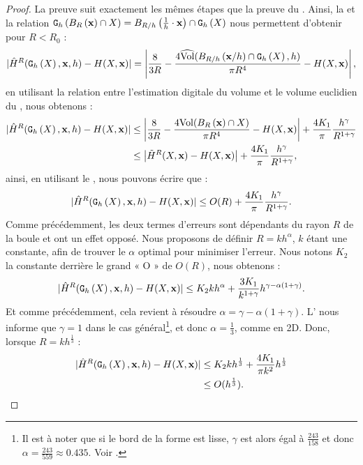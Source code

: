 \begin{proof}
  La preuve suit exactement les mêmes étapes que la preuve du
  . Ainsi, la
   et la relation
  $\DigF{\Ball{R}{\vx} \cap \Shape}{h}=\Ball{R/h}{\frac{1}{h} \cdot \vx} \cap \DSh$ nous
  permettent d'obtenir pour $R < R_0$ :
  \begin{equation}
    | \MeanCurvH{R}(\DSh,\vx,h) - \MeanCurv(\Shape,\vx) |
    = \left|\frac{8}{3R}-\frac{4\VolC(\Ball{R/h}{\vx / h} \cap \DSh, h)}{\pi R^4} - \MeanCurv(\Shape,\vx) \right|,
  \end{equation}
  en utilisant la relation entre l'estimation digitale du volume et le volume
  euclidien du , nous obtenons :
  \begin{align}\label{eq-meancurvhat-error-bound-prelim}
    | \MeanCurvH{R}(\DSh,\vx,h) - \MeanCurv(\Shape,\vx) |
    &\le \left|\frac{8}{3R}-\frac{4\Vol(\Ball{R}{\vx} \cap \Shape)}{\pi R^4} - \MeanCurv(\Shape,\vx) \right| + \frac{4 K_1}{\pi} \frac{h^\gamma}{R^{1+\gamma}} \nonumber \\
    &\le \left|\MeanCurvT{R}(\Shape,\vx) - \MeanCurv(\Shape,\vx) \right| + \frac{4 K_1}{\pi} \frac{h^\gamma}{R^{1+\gamma}},
  \end{align}
  ainsi, en utilisant le , nous pouvons
  écrire que :
  \begin{equation}\label{eq-meancurvhat-error-bound-prelim2}
    | \MeanCurvH{R}(\DSh,\vx,h) - \MeanCurv(\Shape,\vx) |
    \le O(R) + \frac{4 K_1}{\pi} \frac{h^\gamma}{R^{1+\gamma}}.
  \end{equation}
  Comme précédemment, les deux termes d'erreurs sont dépendants du rayon $R$ de
  la boule et ont un effet opposé. Nous proposons de définir $R = k h^{\alpha}$,
  $k$ étant une constante, afin de trouver le $\alpha$ optimal pour minimiser
  l'erreur. Nous notons $K_2$ la constante derrière le grand « O » de $O(R)$,
  nous obtenons :
  \begin{equation}\label{eq-meancurvhat-error-bound-prelim3}
    | \MeanCurvH{R}(\DSh,\vx,h) - \MeanCurv(\Shape,\vx) |
    \le K_2kh^\alpha + \frac{3K_1}{k^{1+\gamma}}h^{\gamma - \alpha(1+\gamma)}.
  \end{equation}
  Et comme précédemment, cela revient à résoudre $\alpha = \gamma -
  \alpha(1+\gamma)$. L' nous informe que
  $\gamma = 1$ dans le cas général\footnote{Il est à noter que si le bord de la
  forme est lisse, $\gamma$ est alors égal à $\frac{243}{158}$ et donc $\alpha =
  \frac{243}{559} \approx 0.435$. Voir .}, et
  donc $\alpha = \frac{1}{3}$, comme en 2D. Donc, lorsque $R=kh^{\frac{1}{3}}$ :
  \begin{align}\label{eq-meancurvhat-error-bound-prelim4}
    | \MeanCurvH{R}(\DSh,\vx,h) - \MeanCurv(\Shape,\vx) |
    &\le K_2kh^\frac{1}{3} + \frac{4K_1}{\pi k^2}h^{\frac{1}{3}}\\
    &\le O(h^\frac{1}{3}).
  \end{align}
\end{proof}

